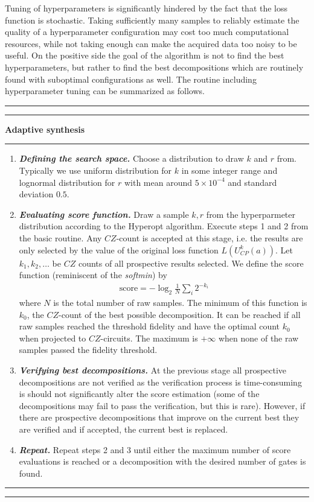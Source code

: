 \documentclass[draft, amsfonts, amssymb, aps, nofootinbib, twocolumn]{revtex4-2}
\begin{document}
Tuning of hyperparameters is significantly hindered by the fact that the loss function is stochastic. Taking sufficiently many samples to reliably estimate the quality of a hyperparameter configuration may cost too much computational resources, while not taking enough can make the acquired data too noisy to be useful. On the positive side the goal of the algorithm is not to find the best hyperparameters, but rather to find the best decompositions which are routinely found with suboptimal configurations as well. The routine including hyperparameter tuning can be summarized as follows.
\\[6pt]
\hrule
\hrule
\vspace{6pt}
{\large\textbf{\qquad Adaptive synthesis}}
\vspace{6pt}
\hrule
\begin{enumerate}
\item \textit{\textbf{Defining the search space.}} Choose a distribution to draw $k$ and $r$ from. Typically we use uniform distribution for $k$ in some integer range and lognormal distribution for $r$ with mean around $5\times 10^{-4}$ and standard deviation $0.5$.
\item \textit{\textbf{Evaluating score function.}} Draw a sample $k, r$ from the hyperparmeter distribution according to the Hyperopt algorithm. Execute steps 1 and 2 from the basic routine. Any $CZ$-count is accepted at this stage, i.e. the results are only selected by the value of the original loss function $L(U_{CP}^k(a))$. Let $k_1, k_2,\dots$ be $CZ$ counts of all prospective results selected. We define the score function (reminiscent of the \textit{softmin}) by 
\begin{align}
\text{score}=-\log_2\frac{1}{N}\sum_{i}2^{-k_i} \label{score}
\end{align}
where $N$ is the total number of raw samples. The minimum of this function is $k_0$, the $CZ$-count of the best possible decomposition. It can be reached if all raw samples reached the threshold fidelity and have the optimal count $k_0$ when projected to $CZ$-circuits. The maximum is $+\infty$ when none of the raw samples passed the fidelity threshold.
\item \textit{\textbf{Verifying best decompositions.}} At the previous stage all prospective decompositions are not verified as the verification process is time-consuming is should not significantly alter the score estimation (some of the decompositions may fail to pass the verification, but this is rare). However, if there are prospective decompositions that improve on the current best they are verified and if accepted, the current best is replaced.

\item \textit{\textbf{Repeat.}} Repeat steps 2 and 3 until either the maximum number of score evaluations is reached or a decomposition with the desired number of gates is found.
\end{enumerate}
\hrule
\hrule
\end{document}
